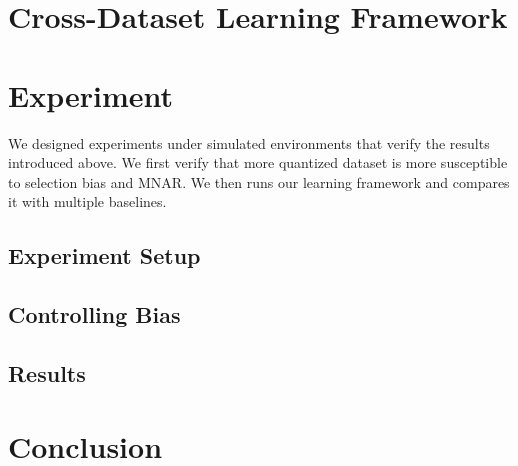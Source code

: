 \documentclass{article}
\begin{document}
\section{Cross-Dataset Learning Framework}

\section{Experiment}
We designed experiments under simulated environments that verify the results introduced above. We first verify that more quantized dataset is more susceptible to selection bias and MNAR. We then runs our learning framework and compares it with multiple baselines.

\subsection{Experiment Setup}

\subsection{Controlling Bias}

\subsection{Results}

\section{Conclusion}
\end{document}
